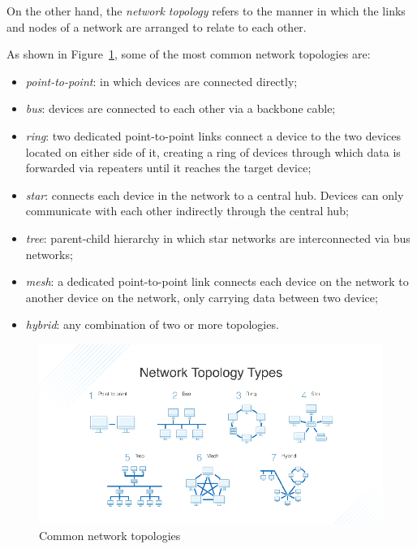 		On the other hand, the \textit{network topology} refers to the manner in which the links and nodes of a network are arranged to relate to each other.
	
		
		As shown in Figure~\ref{img:network_topologies}, some of the most common network topologies are:
		\begin{itemize}
			\item \textit{point-to-point}: in which devices are connected directly;
			\item \textit{bus}: devices are connected to each other via a backbone cable;
			\item \textit{ring}: two dedicated point-to-point links connect a device to the two devices located on either side of it, creating a ring of devices through which data is forwarded via repeaters until it reaches the target device;
			\item \textit{star}: connects each device in the network to a central hub. Devices can only communicate with each other indirectly through the central hub;
			\item \textit{tree}: parent-child hierarchy in which star networks are interconnected via bus networks;
			\item \textit{mesh}: a dedicated point-to-point link connects each device on the network to another device on the network, only carrying data between two device;
			\item \textit{hybrid}: any combination of two or more topologies.
		\end{itemize}
	
		\begin{figure}[h]
			\centering
			\includegraphics[width=\textwidth]{resources/img/chap3/network_topologies}
			\caption{Common network topologies}
			\label{img:network_topologies}
		\end{figure}
	
